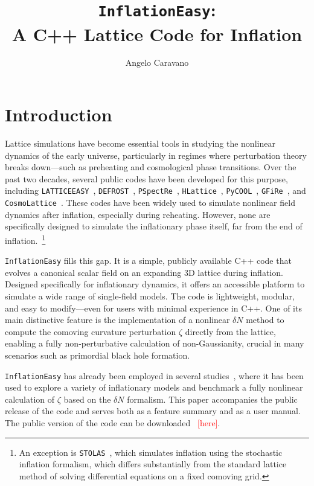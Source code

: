 \documentclass[aps, nofootinbib,superscriptaddress, preprintnumbers, longbibliography]{article}
\title{
	\texttt{InflationEasy}:\\ A C++ Lattice Code for Inflation
}
\author[a]{Angelo Caravano}
\affiliation[a]{Institut d'Astrophysique de Paris, UMR 7095 du CNRS et de Sorbonne Universit\'e,\\ 98 bis bd Arago, 75014 Paris, France}
\begin{document}
	\maketitle
	
	\section{Introduction}

Lattice simulations have become essential tools in studying the nonlinear dynamics of the early universe, particularly in regimes where perturbation theory breaks down—such as preheating and cosmological phase transitions. Over the past two decades, several public codes have been developed for this purpose, including \texttt{LATTICEEASY}~\cite{latticeeasy}, \texttt{DEFROST}~\cite{Frolov_2008}, \texttt{PSpectRe}~\cite{Easther_2010}, \texttt{HLattice}~\cite{hlattice}, \texttt{PyCOOL}~\cite{Sainio_2012}, \texttt{GFiRe}~\cite{Lozanov_2020}, and \texttt{CosmoLattice}~\cite{figueroa2021cosmolattice}. These codes have been widely used to simulate nonlinear field dynamics after inflation, especially during reheating. However, none are specifically designed to simulate the inflationary phase itself, far from the end of inflation.~\footnote{An exception is \texttt{STOLAS}~\cite{Mizuguchi:2024kbl}, which simulates inflation using the stochastic inflation formalism, which differs substantially from the standard lattice method of solving differential equations on a fixed comoving grid.}

\texttt{InflationEasy} fills this gap. It is a simple, publicly available C++ code that evolves a canonical scalar field on an expanding 3D lattice during inflation. Designed specifically for inflationary dynamics, it offers an accessible platform to simulate a wide range of single-field models. The code is lightweight, modular, and easy to modify—even for users with minimal experience in C++. One of its main distinctive feature is the implementation of a nonlinear $\delta N$ method to compute the comoving curvature perturbation $\zeta$ directly from the lattice, enabling a fully non-perturbative calculation of non-Gaussianity, crucial in many scenarios such as primordial black hole formation.

\texttt{InflationEasy} has already been employed in several studies~\cite{Caravano:2021pgc,Caravano:2022yyv,Caravano:2024tlp,Caravano:2024xsb,Caravano:2024moy, USR2}, where it has been used to explore a variety of inflationary models and benchmark a fully nonlinear calculation of $\zeta$ based on the $\delta N$ formalism. This paper accompanies the public release of the code and serves both as a feature summary and as a user manual. The public version of the code can be downloaded ~\textcolor{red}{[here]}.
\end{document}

